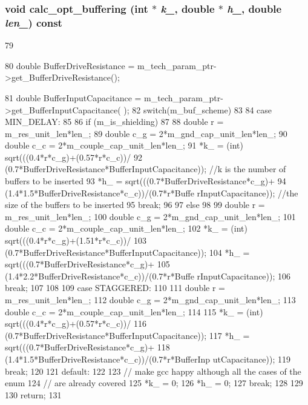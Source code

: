 \hypertarget{classWire_a9e250520c7c83648a5d8d82cdc14398f}{
\subsubsection[{calc\_\-opt\_\-buffering}]{\setlength{\rightskip}{0pt plus 5cm}void calc\_\-opt\_\-buffering (int $\ast$ {\em k\_\-}, \/  double $\ast$ {\em h\_\-}, \/  double {\em len\_\-}) const}}
\label{classWire_a9e250520c7c83648a5d8d82cdc14398f}



\begin{DoxyCode}
79 {
80     double BufferDriveResistance = m_tech_param_ptr->get_BufferDriveResistance();
      
81     double BufferInputCapacitance = m_tech_param_ptr->get_BufferInputCapacitance(
      );
82     switch(m_buf_scheme)
83     {
84         case MIN_DELAY:
85             {
86                 if (m_is_shielding)
87                 {
88                     double r = m_res_unit_len*len_;
89                     double c_g = 2*m_gnd_cap_unit_len*len_;
90                     double c_c = 2*m_couple_cap_unit_len*len_;
91                     *k_ = (int) sqrt(((0.4*r*c_g)+(0.57*r*c_c))/
92                             (0.7*BufferDriveResistance*BufferInputCapacitance)); 
      //k is the number of buffers to be inserted
93                     *h_ = sqrt(((0.7*BufferDriveResistance*c_g)+
94                                 (1.4*1.5*BufferDriveResistance*c_c))/(0.7*r*Buffe
      rInputCapacitance)); //the size of the buffers to be inserted
95                     break;
96                 }
97                 else
98                 {
99                     double r = m_res_unit_len*len_;
100                     double c_g = 2*m_gnd_cap_unit_len*len_;
101                     double c_c = 2*m_couple_cap_unit_len*len_;
102                     *k_ = (int) sqrt(((0.4*r*c_g)+(1.51*r*c_c))/
103                             (0.7*BufferDriveResistance*BufferInputCapacitance));
104                     *h_ = sqrt(((0.7*BufferDriveResistance*c_g)+
105                                 (1.4*2.2*BufferDriveResistance*c_c))/(0.7*r*Buffe
      rInputCapacitance));
106                     break;
107                 }
108             }
109         case STAGGERED:
110             {
111                 double r = m_res_unit_len*len_;
112                 double c_g = 2*m_gnd_cap_unit_len*len_;
113                 double c_c = 2*m_couple_cap_unit_len*len_;
114 
115                 *k_ = (int) sqrt(((0.4*r*c_g)+(0.57*r*c_c))/
116                         (0.7*BufferDriveResistance*BufferInputCapacitance));
117                 *h_ = sqrt(((0.7*BufferDriveResistance*c_g)+
118                             (1.4*1.5*BufferDriveResistance*c_c))/(0.7*r*BufferInp
      utCapacitance));
119                 break;
120             }
121         default:
122             {
123                 // make gcc happy although all the cases of the enum
124                 // are already covered
125                 *k_ = 0;
126                 *h_ = 0;
127                 break;
128             }
129     }
130     return;
131 }
\end{DoxyCode}
